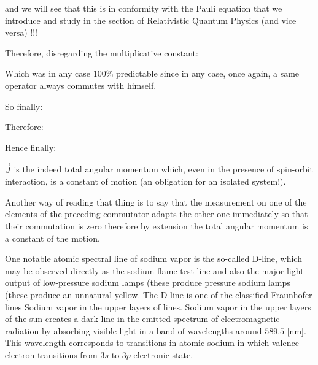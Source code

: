 	and we will see that this is in conformity with the Pauli equation that we introduce and study in the section of Relativistic Quantum Physics (and vice versa) !!!

	Therefore, disregarding the multiplicative constant:
	
	Which was in any case $100\%$ predictable since in any case, once again, a same operator always commutes with himself.

	So finally:	
	
	Therefore:
	
	Hence finally:
	
	$\vec{J}$ is the indeed total angular momentum which, even in the presence of spin-orbit interaction, is a constant of motion (an obligation for an isolated system!).
	\begin{tcolorbox}[title=Remark,colframe=black,arc=10pt]
	Another way of reading that thing is to say that the measurement on one of the elements of the preceding commutator adapts the other one immediately so that their commutation is zero therefore by extension the total angular momentum is a constant of the motion.
	\end{tcolorbox}
	One notable atomic spectral line of sodium vapor is the so-called D-line, which may be observed directly as the sodium flame-test line and also the major light output of low-pressure sodium lamps (these produce pressure sodium lamps (these produce an unnatural yellow. The D-line is one of the classified Fraunhofer lines Sodium vapor in the upper layers of lines. Sodium vapor in the upper layers of the sun creates a dark line in the emitted spectrum of electromagnetic radiation by absorbing visible light in a band of wavelengths around $589.5$ [nm]. This wavelength corresponds to transitions in atomic sodium in which valence-electron transitions from $3s$ to $3p$ electronic state.
	
